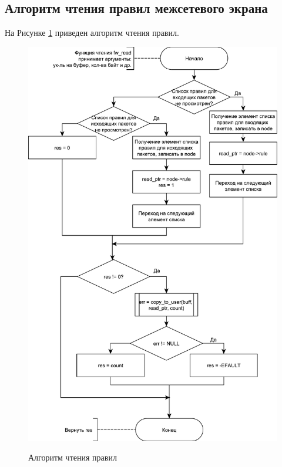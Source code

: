 \newpage

\subsection{Алгоритм чтения правил межсетевого экрана}
На Рисунке \ref{fig23:image} приведен алгоритм чтения правил.
\begin{figure}[h!]
	\begin{center}
		{\includegraphics[scale = 0.63]{img/read.pdf}}
		\caption{Алгоритм чтения правил}
		\label{fig23:image}
	\end{center}
\end{figure}

\newpage

